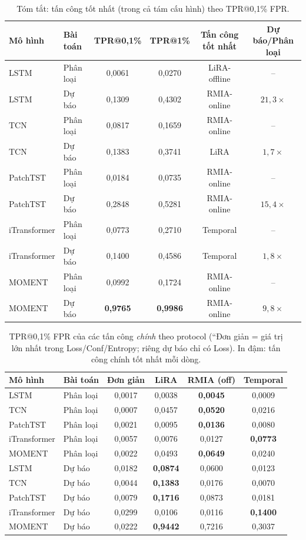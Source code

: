 \documentclass[12pt,a4paper]{report}
\begin{document}
\begin{table}[H]
\centering
\caption{Tóm tắt: tấn công tốt nhất (trong cả tám cấu hình) theo TPR@0,1\% FPR.}
\label{tab:summary}
\begin{tabular}{llcccc}
\toprule
\textbf{Mô hình} & \textbf{Bài toán} & \textbf{TPR@0,1\%} & \textbf{TPR@1\%} & \textbf{Tấn công tốt nhất} & \textbf{Dự báo/Phân loại} \\
\midrule
LSTM & Phân loại & 0,0061 & 0,0270 & LiRA-offline & -- \\
LSTM & Dự báo & 0,1309 & 0,4302 & RMIA-online & $21,3\times$ \\
TCN & Phân loại & 0,0817 & 0,1659 & RMIA-online & -- \\
TCN & Dự báo & 0,1383 & 0,3741 & LiRA & $1,7\times$ \\
PatchTST & Phân loại & 0,0184 & 0,0735 & RMIA-online & -- \\
PatchTST & Dự báo & 0,2848 & 0,5281 & RMIA-online & $15,4\times$ \\
iTransformer & Phân loại & 0,0773 & 0,2710 & Temporal & -- \\
iTransformer & Dự báo & 0,1400 & 0,4586 & Temporal & $1,8\times$ \\
MOMENT & Phân loại & 0,0992 & 0,1724 & RMIA-online & -- \\
MOMENT & Dự báo & \textbf{0,9765} & \textbf{0,9986} & RMIA-online & $9,8\times$ \\
\bottomrule
\end{tabular}
\end{table}

\begin{table}[H]
\centering
\caption{TPR@0,1\% FPR của các tấn công \textit{chính} theo protocol (``Đơn giản = giá trị lớn nhất trong Loss/Conf/Entropy; riêng dự báo chỉ có Loss). In đậm: tấn công chính tốt nhất mỗi dòng.}
\label{tab:main_attacks}
\begin{tabular}{llcccc}
\toprule
\textbf{Mô hình} & \textbf{Bài toán} & \textbf{Đơn giản} & \textbf{LiRA} & \textbf{RMIA (off)} & \textbf{Temporal} \\
\midrule
LSTM & Phân loại & 0,0017 & 0,0038 & \textbf{0,0045} & 0,0009 \\
TCN & Phân loại & 0,0007 & 0,0457 & \textbf{0,0520} & 0,0216 \\
PatchTST & Phân loại & 0,0021 & 0,0095 & \textbf{0,0136} & 0,0080 \\
iTransformer & Phân loại & 0,0057 & 0,0076 & 0,0127 & \textbf{0,0773} \\
MOMENT & Phân loại & 0,0022 & 0,0493 & \textbf{0,0649} & 0,0240 \\
\midrule
LSTM & Dự báo & 0,0182 & \textbf{0,0874} & 0,0600 & 0,0123 \\
TCN & Dự báo & 0,0044 & \textbf{0,1383} & 0,0176 & 0,0070 \\
PatchTST & Dự báo & 0,0079 & \textbf{0,1716} & 0,0873 & 0,0181 \\
iTransformer & Dự báo & 0,0299 & 0,0106 & 0,0116 & \textbf{0,1400} \\
MOMENT & Dự báo & 0,0222 & \textbf{0,9442} & 0,7216 & 0,3037 \\
\bottomrule
\end{tabular}
\end{table}
\end{document}

